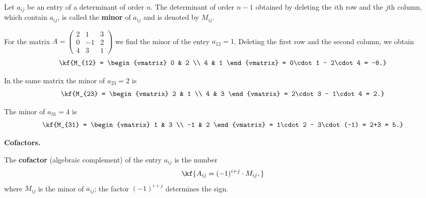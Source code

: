 \begin{tarif}
Let $a_{ij}$ be an entry of a determinant of order $n$. The determinant of order
$n-1$ obtained by deleting the $i$th row and the $j$th column, which contain
$a_{ij}$, is called the \textbf{minor} of $a_{ij}$ and is denoted by $M_{ij}$.
\end{tarif}
\begin{misol}
For the matrix
$A=\begin{pmatrix}2 & 1 & 3\\ 0 & -1 & 2\\ 4 & 3 & 1\end{pmatrix}$
we find the minor of the entry $a_{12}=1$. Deleting the first row and the second
column, we obtain
\[\kf{M_{12} = \begin{vmatrix} 0 & 2 \\ 4 & 1 \end{vmatrix} = 0\cdot 1 - 2\cdot 4 = -8.}\]
\end{misol}
\begin{misol}
In the same matrix the minor of $a_{23}=2$ is
\[\kf{M_{23} = \begin{vmatrix} 2 & 1 \\ 4 & 3 \end{vmatrix} = 2\cdot 3 - 1\cdot 4 = 2.}\]
\end{misol}
\begin{misol}
The minor of $a_{31}=4$ is
\[\kf{M_{31} = \begin{vmatrix} 1 & 3 \\ -1 & 2 \end{vmatrix} = 1\cdot 2 - 3\cdot(-1) = 2+3 = 5.}\]
\end{misol}
\textbf{Cofactors.}
\vspace{3pt}
\begin{tarif}
The \textbf{cofactor} (algebraic complement) of the entry $a_{ij}$ is the number
\[\kf{A_{ij} = (-1)^{i+j} \cdot M_{ij},}\]
where $M_{ij}$ is the minor of $a_{ij}$; the factor $(-1)^{i+j}$ determines the sign.
\end{tarif}

